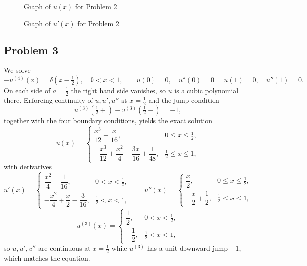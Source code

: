 \documentclass[12pt, a4paper]{article}
\begin{document}
\begin{figure}[h]
  \centering
  \caption{Graph of \(u(x)\) for Problem 2}
\end{figure}

\begin{figure}[h]
  \centering
  \caption{Graph of \(u'(x)\) for Problem 2}
\end{figure}

\subsection*{Problem 3}

We solve
\[
-u^{(4)}(x)=\delta\!\left(x-\tfrac{1}{2}\right),\quad 0<x<1,
\qquad u(0)=0,\quad u''(0)=0,\quad u(1)=0,\quad u''(1)=0 .
\]
On each side of \(a=\tfrac12\) the right hand side vanishes, so \(u\) is a cubic polynomial there. Enforcing
continuity of \(u,u',u''\) at \(x=\tfrac12\) and the jump condition
\[
u^{(3)}\!\left(\tfrac12+\right)-u^{(3)}\!\left(\tfrac12-\right)=-1,
\]
together with the four boundary conditions, yields the exact solution
\[
u(x)=
\begin{cases}
\dfrac{x^{3}}{12}-\dfrac{x}{16}, & 0\le x\le \tfrac12,\\[6pt]
-\dfrac{x^{3}}{12}+\dfrac{x^{2}}{4}-\dfrac{3x}{16}+\dfrac{1}{48}, & \tfrac12\le x\le 1,
\end{cases}
\]
with derivatives
\[
u'(x)=
\begin{cases}
\dfrac{x^{2}}{4}-\dfrac{1}{16}, & 0< x< \tfrac12,\\[6pt]
-\dfrac{x^{2}}{4}+\dfrac{x}{2}-\dfrac{3}{16}, & \tfrac12< x< 1,
\end{cases}
\qquad
u''(x)=
\begin{cases}
\dfrac{x}{2}, & 0\le x\le \tfrac12,\\[6pt]
-\dfrac{x}{2}+\dfrac{1}{2}, & \tfrac12\le x\le 1,
\end{cases}
\]
\[
u^{(3)}(x)=
\begin{cases}
\dfrac{1}{2}, & 0< x< \tfrac12,\\[6pt]
-\dfrac{1}{2}, & \tfrac12< x< 1,
\end{cases}
\]
so \(u,u',u''\) are continuous at \(x=\tfrac12\) while \(u^{(3)}\) has a unit downward jump \(-1\), which matches the equation.
\end{document}

